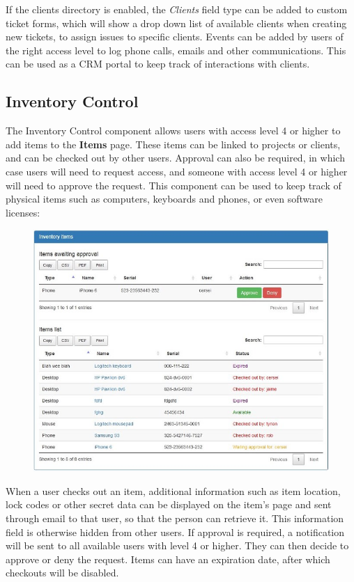\documentclass[11pt]{article}
\begin{document}
If the clients directory is enabled, the \textit{Clients} field type can be added to custom ticket forms, which will show a drop down list of available clients when creating new tickets, to assign issues to specific clients. Events can be added by users of the right access level to log phone calls, emails and other communications. This can be used as a CRM portal to keep track of interactions with clients. 

\subsection{Inventory Control}
The Inventory Control component allows users with access level 4 or higher to add items to the \textbf{Items} page. These items can be linked to projects or clients, and can be checked out by other users. Approval can also be required, in which case users will need to request access, and someone with access level 4 or higher will need to approve the request. This component can be used to keep track of physical items such as computers, keyboards and phones, or even software licenses:

\begin{figure}[h]
\includegraphics{items.jpg}
\end{figure}

When a user checks out an item, additional information such as item location, lock codes or other secret data can be displayed on the item's page and sent through email to that user, so that the person can retrieve it. This information field is otherwise hidden from other users. If approval is required, a notification will be sent to all available users with level 4 or higher. They can then decide to approve or deny the request. Items can have an expiration date, after which checkouts will be disabled.
\end{document}
